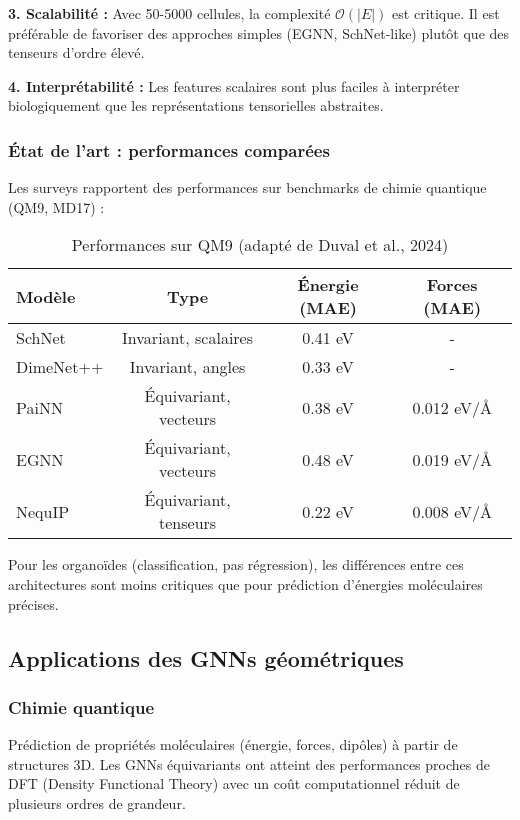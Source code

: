 \textbf{3. Scalabilité :}
Avec 50-5000 cellules, la complexité $\mathcal{O}(|E|)$ est critique. Il est préférable de favoriser des approches simples (EGNN, SchNet-like) plutôt que des tenseurs d'ordre élevé.

\textbf{4. Interprétabilité :}
Les features scalaires sont plus faciles à interpréter biologiquement que les représentations tensorielles abstraites.

\subsubsection{État de l'art : performances comparées}

Les surveys rapportent des performances sur benchmarks de chimie quantique (QM9, MD17) :

\begin{table}[h]
\centering
\small
\begin{tabular}{lccc}
\hline
\textbf{Modèle} & \textbf{Type} & \textbf{Énergie (MAE)} & \textbf{Forces (MAE)} \\
\hline
SchNet & Invariant, scalaires & 0.41 eV & - \\
DimeNet++ & Invariant, angles & 0.33 eV & - \\
PaiNN & Équivariant, vecteurs & 0.38 eV & 0.012 eV/Å \\
EGNN & Équivariant, vecteurs & 0.48 eV & 0.019 eV/Å \\
NequIP & Équivariant, tenseurs & 0.22 eV & 0.008 eV/Å \\
\hline
\end{tabular}
\caption{Performances sur QM9 (adapté de Duval et al., 2024)}
\end{table}

Pour les organoïdes (classification, pas régression), les différences entre ces architectures sont moins critiques que pour prédiction d'énergies moléculaires précises.

\subsection{Applications des GNNs géométriques}

\subsubsection{Chimie quantique}

Prédiction de propriétés moléculaires (énergie, forces, dipôles) à partir de structures 3D. Les GNNs équivariants ont atteint des performances proches de DFT (Density Functional Theory) avec un coût computationnel réduit de plusieurs ordres de grandeur.

